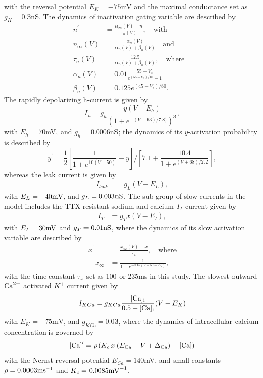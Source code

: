 \documentclass[nofootinbib,aip,amsmath,amssymb,reprint,twocolumn,10pt]{revtex4-2}
\begin{document}
with the reversal potential $E_{K}=-75$mV and the maximal conductance set as $g_K=0.3$nS. The dynamics of inactivation gating variable are described by 
\begin{align}
{n}^\prime &= \frac{n_{\infty}(V)-n}{\tau_{n}(V)}, \quad \mbox{with} \quad \\
n_{\infty}(V) &= \frac{\alpha_{n}(V)}{\alpha_{n}(V) +\beta_{n}(V)} \quad \mbox{and} \quad \\
\tau_{n}(V) &= \frac{12.5}{\alpha_{n}(V) +\beta_{n}(V)}, \quad \mbox{where} \quad \\
\alpha_{n}(V) &= 0.01 \frac{55-V_s}{e^{(55-V_s)/10}-1} \quad \mbox{} \quad \\
\beta_{n}(V) &= 0.125 e^{(45-V_s)/80}.
\end{align}	
The rapidly depolarizing h-current is given by 
\begin{equation}
I_{h}=g_{h} \frac{y (V-E_{h})}{(1+e^{-(V-63)/7.8)})^3}, 
\end{equation}
with $E_{h}=70$mV, and $g_h=0.0006$nS; the dynamics of its $y$-activation probability is described by 
 \begin{equation}
{y}^\prime = \frac{1}{2} \left [ \frac{1}{1+e^{10(V-50)}}-y \right ]/ \left [ 7.1+\frac{10.4}{1+e^{(V+68)/2.2}} \right ], 
\end{equation}	
whereas the leak current is given by 
\begin{align}
I_{leak} &=g_{L} (V-E_{L}), 
\end{align}
with $E_{L} =-40{\rm mV}$, and $g_{L}=0.003{\rm nS}$. The sub-group of slow currents in the model includes the TTX-resistant sodium and calcium $I_{T}$-current given by   \begin{align}
 I_{T} &= g_{T} x (V-E_{I}),
\end{align}
with $E_{I} =30{\rm mV}$ and $g_{T}=0.01{\rm nS}$, where the dynamics of its slow activation variable are described by  
 \begin{align}
{x}^\prime &= \frac{x_{\infty}(V)-x}{\tau_{x}}, \quad \mbox{where} \\ 
\quad x_{\infty} &= \frac{1}{1+e^{-0.15(V+50-\Delta_x)}},
\end{align}\label{eqttx} 
with the time constant $\tau_{x}$ set as 100 or 235ms in this study. The slowest outward ${\rm Ca}^{2+}$ activated $K^+$ current given by  
\begin{equation}
I_{KCa} =g_{KCa}\frac{[\rm Ca]_i}{0.5+[\rm Ca]_i}(V-E_{K})
 \label{IKCa}
\end{equation}
with  $E_{K}=-75\mbox{mV}$, and $g_{KCa}=0.03$, where the dynamics of intracellular calcium concentration is governed by 
\begin{equation}
{[\rm Ca]}^\prime  =  \rho \left ( K_{c}\, x\, (E_{\rm Ca}-V + \Delta_{\rm Ca})-[\rm Ca] \right  )  \label{eqCa}
\end{equation}
with the Nernst reversal potential  $E_{Ca}=140$mV, and small constants $\rho= 0.0003{\rm ms}^{-1}$ and  $K_c=0.0085{\rm mV}^{-1}$.
\end{document}
